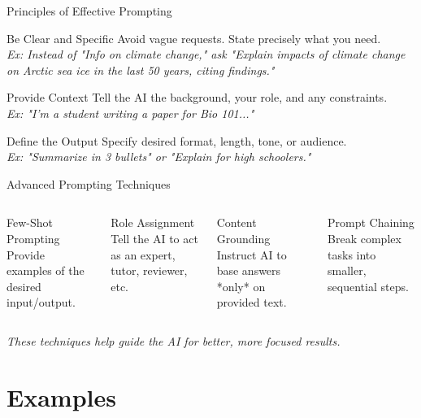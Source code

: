\documentclass{beamer}
\begin{document}
\begin{frame}{Principles of Effective Prompting}
\begin{block}{Be Clear and Specific}
Avoid vague requests. State precisely what you need. \\
\textit{Ex: Instead of "Info on climate change," ask "Explain impacts of climate change on Arctic sea ice in the last 50 years, citing findings."}
\end{block}
\pause
\begin{block}{Provide Context}
Tell the AI the background, your role, and any constraints. \\
\textit{Ex: "I'm a student writing a paper for Bio 101..."}
\end{block}
\pause
\begin{block}{Define the Output}
Specify desired format, length, tone, or audience. \\
\textit{Ex: "Summarize in 3 bullets" or "Explain for high schoolers."}
\end{block}
\end{frame}

\begin{frame}{Advanced Prompting Techniques}
\begin{columns}
\begin{block}{Few-Shot Prompting}
Provide examples of the desired input/output.
\end{block}
\pause
\begin{block}{Role Assignment}
Tell the AI to act as an expert, tutor, reviewer, etc.
\end{block}
\pause
\begin{block}{Content Grounding}
Instruct AI to base answers *only* on provided text.
\end{block}
\pause
\begin{block}{Prompt Chaining}
Break complex tasks into smaller, sequential steps.
\end{block}
\end{columns}
\vspace{0.5cm}

\textit{These techniques help guide the AI for better, more focused results.}
\end{frame}

\section{Examples}
\end{document}
